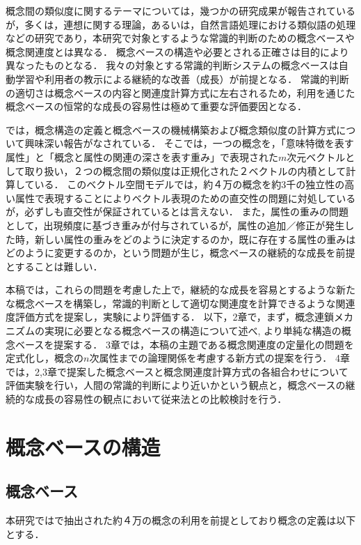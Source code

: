 概念間の類似度に関するテーマについては，幾つかの研究成果が報告されているが\cite{okada,oosuga,suzuki}，多くは，連想に関する理論，あるいは，自然言語処理における類似語の処理などの研究であり，本研究で対象とするような常識的判断のための概念ベースや概念関連度とは異なる．
概念ベースの構造や必要とされる正確さは目的により異なったものとなる．
我々の対象とする常識的判断システムの概念ベースは自動学習や利用者の教示による継続的な改善（成長）が前提となる．
常識的判断の適切さは概念ベースの内容と関連度計算方式に左右されるため，利用を通じた概念ベースの恒常的な成長の容易性は極めて重要な評価要因となる．

\cite{kasahara4}では，概念構造の定義と概念ベースの機械構築および概念類似度の計算方式について興味深い報告がなされている．
そこでは，一つの概念を，「意味特徴を表す属性」と「概念と属性の関連の深さを表す重み」で表現された$m$次元ベクトルとして取り扱い，２つの概念間の類似度は正規化された２ベクトルの内積として計算している．
このベクトル空間モデルでは，約４万の概念を約3千の独立性の高い属性で表現することによりベクトル表現のための直交性の問題に対処しているが，必ずしも直交性が保証されているとは言えない．
また，属性の重みの問題として，出現頻度に基づき重みが付与されているが，属性の追加／修正が発生した時，新しい属性の重みをどのように決定するのか，既に存在する属性の重みはどのように変更するのか，という問題が生じ，概念ベースの継続的な成長を前提とすることは難しい．

本稿では，これらの問題を考慮した上で，継続的な成長を容易とするような新たな概念ベースを構築し，常識的判断として適切な関連度を計算できるような関連度評価方式を提案し，実験により評価する．
以下，2章で，まず，概念連鎖メカニズムの実現に必要となる概念ベースの構造について述べ,
より単純な構造の概念ベースを提案する．
3章では，本稿の主題である概念関連度の定量化の問題を定式化し，概念の$n$次属性までの論理関係を考慮する新方式の提案を行う．
4章では，2,3章で提案した概念ベースと概念関連度計算方式の各組合わせについて評価実験を行い，人間の常識的判断により近いかという観点と，概念ベースの継続的な成長の容易性の観点において従来法との比較検討を行う．

\section{概念ベースの構造}

\subsection{概念ベース}\label{BasicCB}

本研究では\cite{kasahara1,kasahara4}で抽出された約４万の概念の利用を前提としており概念の定義は以下とする．

